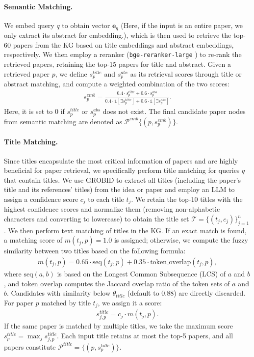 \paragraph{Semantic Matching.}
We embed query $q$ to obtain vector $\mathbf{e}_q$ (Here, if the input is an entire paper, we only extract its abstract for embedding.), which is then used to retrieve the top-$60$ papers from the KG based on title embeddings and abstract embeddings, respectively.
We then employ a reranker (\texttt{bge-reranker-large} \citep{bge}) to re-rank the retrieved papers, retaining the top-$15$ papers for title and abstract.
Given a retrieved paper $p$, we define $s_p^{title}$ and $s_p^{abs}$ as its retrieval scores through title or abstract matching, and compute a weighted combination of the two scores:
\begin{align}
\label{eq:weighted}
    s_p^{emb}=\frac{0.4\cdot s_p^{title}+0.6\cdot s_p^{abs}}{0.4\cdot \mathbb{1}[\exists s_p^{title}]+0.6\cdot \mathbb{1}[\exists s_p^{abs}]}.
\end{align}
Here, it is set to $0$ if $s_p^{title}$ or $s_p^{abs}$ does not exist.
The final candidate paper nodes from semantic matching are denoted as $\mathcal{P}^{emb}\{(p, s_p^{emb})\}$.

\paragraph{Title Matching.}
Since titles encapsulate the most critical information of papers and are highly beneficial for paper retrieval, we specifically perform title matching for queries $q$ that contain titles.
We use GROBID to extract all titles (including the paper's title and its references' titles) from the idea or paper and employ an LLM to assign a confidence score $c_j$ to each title $t_j$.
We retain the top-$10$ titles with the highest confidence scores and normalize them (removing non-alphabetic characters and converting to lowercase) to obtain the title set $\mathcal{T}=\{(t_j, c_j)\}_{j=1}^n$.
We then perform text matching of titles in the KG.
If an exact match is found, a matching score of $m(t_j, p)=1.0$ is assigned; otherwise, we compute the fuzzy similarity between two titles based on the following formula:
\begin{align}
    m(t_j, p)=0.65\cdot \text{seq}(t_j, p)+0.35\cdot \text{token\_overlap}(t_j, p),
\end{align}
where $\text{seq}(a, b)$ is based on the Longest Common Subsequence (LCS) of $a$ and $b$, and $\text{token\_overlap}$ computes the Jaccard overlap ratio of the token sets of $a$ and $b$.
Candidates with similarity below $\theta_{title}$ (default to $0.88$) are directly discarded.
For paper $p$ matched by title $t_j$, we assign it a score:
\begin{align}
    s_{j,p}^{title}=c_j\cdot m(t_j,p).
\end{align}
If the same paper is matched by multiple titles, we take the maximum score $s_p^{title}=\max_js_{j,p}^{title}$.
Each input title retains at most the top-5 papers, and all papers constitute $\mathcal{P}^{title}=\{(p, s_p^{title})\}$.

